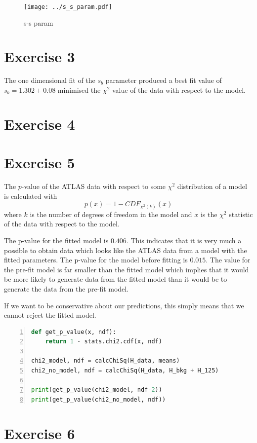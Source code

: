 \documentclass{article}
\begin{document}
\begin{figure}
    \centering
    \texttt{[image: ../s\_s\_param.pdf]}
    \caption{s-s param}
    \label{fig:s_s_param}
\end{figure}

\section*{Exercise 3}
The one dimensional fit of the $s_b$ parameter produced a best fit value of $s_b= 1.302 \pm 0.08$ minimised the $\chi^2$ value of the data with respect to the model.

\section*{Exercise 4}

\section*{Exercise 5}
The $p$-value of the ATLAS data with respect to some $\chi^2$ distribution of a model is calculated with
\begin{equation}
    p(x) = 1 - CDF_{\chi^2(k)}(x)
\end{equation}
where $k$ is the number of degrees of freedom in the model and $x$ is the $\chi^2$ statistic of the data with respect to the model.

The p-value for the fitted model is $0.406$. This indicates that it is very much a possible to obtain data which looks like the ATLAS data from a model with the fitted parameters. The p-value for the model before fitting is $0.015$. The value for the pre-fit model is far smaller than the fitted model which implies that it would be more likely to generate data from the fitted model than it would be to generate the data from the pre-fit model.

If we want to be conservative about our predictions, this simply means that we cannot reject the fitted model.

\begin{lstlisting}[language=Python, numbers=left]
def get_p_value(x, ndf):
    return 1 - stats.chi2.cdf(x, ndf)

chi2_model, ndf = calcChiSq(H_data, means)
chi2_no_model, ndf = calcChiSq(H_data, H_bkg + H_125)

print(get_p_value(chi2_model, ndf-2))
print(get_p_value(chi2_no_model, ndf))
\end{lstlisting}

\section*{Exercise 6}
\end{document}
